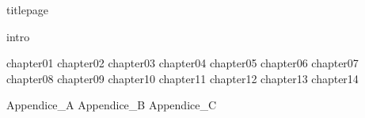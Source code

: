 \documentclass[
	,a4paper
	,12pt
	,oneside
]{book}
\begin{document}
\frontmatter

	{titlepage}
	\tableofcontents

	{intro}

\mainmatter

	{chapter01}
	{chapter02}
	{chapter03}
	{chapter04}
	{chapter05}
	{chapter06}
	{chapter07}
	{chapter08}
	{chapter09}
	{chapter10}
	{chapter11}
	{chapter12}
	{chapter13}
	{chapter14}

	\appendix
	{Appendice_A}
	\restoregeometry
	{Appendice_B}
	{Appendice_C}
\backmatter
\end{document}
